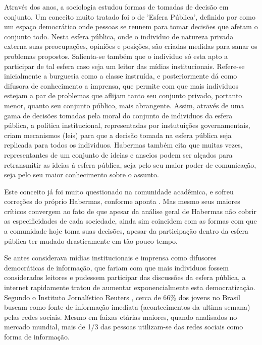 \documentclass[
	12pt,				%
	oneside,			%
	a4paper,			%
	english,			%
	brazil				%
	]{abntex2ppgsi}
\begin{document}
Através dos anos, a sociologia estudou formas de tomadas de decisão em conjunto. Um conceito muito tratado foi o de 'Esfera Pública', definido por  como um espaço democrático onde pessoas se reunem para tomar decisões que afetam o conjunto todo. Nesta esfera pública, onde o individuo de natureza privada externa suas preocupações, opiniões e posições, são criadas medidas para sanar os problemas propostos. Salienta-se também que o individuo só esta apto a participar de tal esfera caso seja um leitor das mídias institucionais. Refere-se inicialmente a burguesia como a classe instruída, e posteriormente dá como difusora de conhecimento a imprensa, que permite com que mais individuos estejam a par de problemas que aflijam tanto seu conjunto privado, portanto menor, quanto seu conjunto público, mais abrangente. Assim, através de uma gama de decisões tomadas pela moral do conjunto de individuos da esfera pública, a política institucional, representadas por instutuições governamentais, criam mecanismos (leis) para que a decisão tomada na esfera pública seja replicada para todos os individuos. Habermas também cita que muitas vezes, representantes de um conjunto de ideias e anseios podem ser alçados para retransmitir as ideias à esfera pública, seja pelo seu maior poder de comunicação, seja pelo seu maior conhecimento sobre o assunto. 

Este conceito já foi muito questionado na comunidade acadêmica, e sofreu correções do próprio Habermas, conforme aponta . Mas mesmo seus maiores críticos convergem ao fato de que apesar da análise geral de Habermas não cobrir as especificidades de cada sociedade, ainda sim coincidem com as formas com que a comunidade hoje toma suas decisões, apesar da participação dentro da esfera pública ter mudado drasticamente em tão pouco tempo.

Se antes  considerava mídias institucionais e imprensa como difusores democráticas de informação, que fariam com que mais individuos fossem considerados leitores e pudessem participar das discussões da esfera pública, a internet rapidamente tratou de aumentar exponencialmente esta democratização. Segundo o Instituto Jornalístico Reuters \cite{reuters}, cerca de 66\% dos jovens no Brasil buscam como fonte de informação imediata (acontecimentos da ultima semana) pelas redes sociais. Mesmo em faixas etárias maiores, quando analisados no mercado mundial, mais de 1/3 das pessoas utilizam-se das redes sociais como forma de informação.
\end{document}
